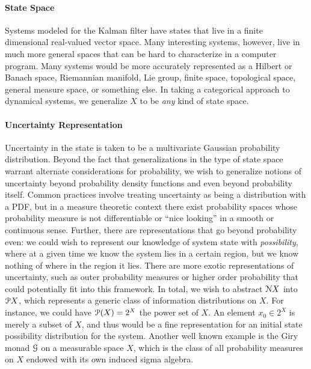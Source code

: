 \paragraph{State Space}

Systems modeled for the Kalman filter have states that live in a finite dimensional real-valued vector space. Many interesting systems, however, live in much more general spaces that can be hard to characterize in a computer program.  Many systems would be more accurately represented as a Hilbert or Banach space, Riemannian manifold, Lie group, finite space, topological space, general measure space, or something else. In taking a categorical approach to dynamical systems, we generalize $X$ to be \emph{any} kind of state space.

\paragraph{Uncertainty Representation}

Uncertainty in the state is taken to be a multivariate Gaussian probability distribution. Beyond the fact that generalizations in the type of state space warrant alternate considerations for probability, we wish to generalize notions of uncertainty beyond probability density functions and even beyond probability itself. Common practices involve treating uncertainty as being a distribution with a PDF, but in a measure theoretic context there exist probability spaces whose probability measure is not differentiable or ``nice looking'' in a smooth or continuous sense. Further, there are representations that go beyond probability even: we could wish to represent our knowledge of system state with \emph{possibility}, where at a given time we know the system lies in a certain region, but we know nothing of where in the region it lies. There are more exotic representations of uncertainty, such as outer probability measures \cite{houssineau} or higher order probability \cite{some moriba paper} that could potentially fit into this framework. In total, we wish to abstract $\mathcal{N} X$ into $\mathcal{P} X$, which represents a generic class of information distributions on $X$. For instance, we could have $\mathcal{P}(X) = 2^X$ the power set of $X$. An element $x_0\in 2^X$ is merely a subset of $X$, and thus would be a fine representation for an initial state possibility distribution for the system. Another well known example is the Giry monad $\mathcal{G}$ on a measurable space $X$, which is the class of all probability measures on $X$ endowed with its own induced sigma algebra.

